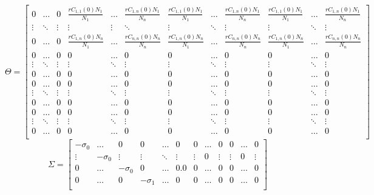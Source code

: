 \textcolor{black}{
\begin{equation}
    \Theta = 
\begin{bmatrix}
0 & \dots & 0  & \frac{r C_{1,1}(0)N_1}{N_1} & \dots &\frac{r C_{1,n}(0)N_1}{N_n} &  \frac{r C_{1,1}(0)N_1}{N_1} & \dots & \frac{r C_{1,n}(0)N_1}{N_n} &  \frac{r C_{1,1}(0)N_1}{N_1} & \dots & \frac{r C_{1,n}(0)N_1}{N_n}  \\
\vdots & \ddots  & \vdots & \vdots & \vdots & \ddots  & \vdots & \ddots & \vdots  & \vdots & \ddots & \vdots \\
0 & \dots & 0 & \frac{r C_{1,n}(0)N_n}{N_1} & \dots & \frac{r C_{n,n}(0)N_n}{N_n}  & \frac{ r C_{1,n}(0)N_n}{N_1} & \dots & \frac{r C_{n,n}(0)N_n}{N_n} & \frac{ r C_{1,n}(0)N_n}{N_1} & \dots & \frac{r C_{n,n}(0)N_n}{N_n} \\ 
0 & \dots & 0  & 0 & \dots & 0  & 0 & \dots & 0 & 0 & \dots & 0  \\
\vdots & \ddots & \vdots & \vdots &  \ddots & \vdots & \vdots & \ddots & \vdots & \vdots & \ddots & \vdots\\
0 & \dots & 0  & 0 & \dots &  0  & 0 & \dots & 0  & 0 & \dots & 0 \\ 
0 & \dots & 0  &  0 & \dots & 0  & 0 & \dots & 0  & 0 & \dots & 0 \\
\vdots & \ddots & \vdots & \vdots & \ddots & \vdots & \vdots & \ddots & \vdots  & \vdots & \ddots & \vdots\\
0 & \dots & 0  & 0 & \dots & 0  & 0 & \dots &  0 & 0 & \dots &  0 \\ 
0 & \dots & 0  &  0 & \dots & 0  & 0 & \dots & 0  & 0 & \dots & 0 \\
\vdots & \ddots & \vdots & \vdots & \ddots & \vdots & \vdots & \ddots & \vdots  & \vdots & \ddots & \vdots\\
0 & \dots & 0  & 0 & \dots & 0  & 0 & \dots &  0 & 0 & \dots &  0 \\ 
\end{bmatrix}
\label{Teqn}
\end{equation}
\begin{equation}
    \Sigma = 
\begin{bmatrix}
-\sigma_0 & \dots & 0  &  0 &\dots & 0  & 0 & \dots & 0   & 0 & \dots & 0  \\
\vdots & -\sigma_0  & \vdots & \vdots &  \ddots & \vdots & \vdots &0 & \vdots & \vdots &0 & \vdots\\
0 & \dots &-\sigma_0  & 0 & \dots & 0.0 & 0 & \dots & 0 & 0 & \dots & 0  \\ 
0 & \dots & 0 & -\sigma_1 & \dots & 0  & 0 & \dots & 0  & 0 & \dots & 0  \\

\end{bmatrix}
\end{equation}}
